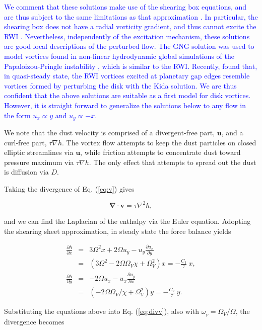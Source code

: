 \documentclass[apj]{emulateapj}
\newcommand{\pderiv}[2]{\frac{\partial #1}{\partial #2}}
\renewcommand{\v}[1]{{\boldsymbol{#1}}} %
\def\blue#1{\textcolor{blue}{ #1}}
\newcommand{\del}{\v{\nabla}}
\newcommand{\Div}{\del\cdot}
\newcommand{\Laplace}{\nabla^2}
\newcommand{\Eq}[1]{Eq. (\ref{#1})}
\newcommand{\eq}[1]{\Eq{#1}}
\newcommand{\beq}{\begin{equation}}
\newcommand{\eeq}{\end{equation}}
\begin{document}
\blue{We comment that these solutions make use of the shearing box
  equations, and are thus subject to the same limitations as that
  approximation \citep{Regev-Umurhan08}. In
  particular, the shearing box does not have a radial vorticity
  gradient, and thus cannot excite the RWI
  \citep{Tagger01}. Nevertheless, independently of the excitation
  mechanism, these solutions are good local descriptions of the perturbed
  flow. The GNG solution was used to model vortices
  found in non-linear hydrodynamic global simulations of the
  Papaloizou-Pringle instability \citep{Hawley87}, which is similar to
  the RWI. Recently, \cite{Lin-Papaloizou11a} found that, in
  quasi-steady state, the RWI vortices excited at planetary gap edges 
  resemble vortices formed by perturbing the disk with
  the Kida solution. We are thus confident that the above solutions are suitable
  as a first model for disk vortices.  However, it is straight forward
  to generalize the solutions below to any flow in the form
  $u_x\propto y$ and $u_y\propto -x$.}

We note that the dust
velocity is comprised of a divergent-free part, $\v{u}$, and a
curl-free part, $\tau\nabla{h}$. The vortex flow attempts to keep the
dust particles on closed elliptic streamlines via $\v{u}$, while friction
attempts to concentrate dust toward pressure maximum via $\tau\nabla
h$. The only effect that attempts to spread out the dust is diffusion
via $D$.  

Taking the divergence of
\eq{eq:v} gives 

\beq
\Div{\v{v}} = \tau \Laplace{h}, 
\label{eq:divv}
\eeq

\noindent and we can find the Laplacian of the enthalpy via the Euler
equation. Adopting the shearing sheet approximation, in steady state
the force balance yields  

\begin{eqnarray}
\pderiv{h}{x} &=& 3\varOmega^2 x + 2\varOmega u_y -
u_y\pderiv{u_x}{y} \nonumber \\
&=& \left(3\varOmega^2 - 2\varOmega\varOmega_V \chi + \varOmega_V^2\right) x
= -\frac{C_1}{\tau} \  x,  \label{eq:gas_mom1}\\
\pderiv{h}{y} &=& - 2\varOmega u_x -
u_x\pderiv{u_y}{x} \nonumber \\
&=& \left(-2\varOmega\varOmega_V/\chi + \varOmega_V^2\right) y = -\frac{C_2}{\tau} \  y.\label{eq:gas_mom2}
\end{eqnarray}

\noindent  Substituting the equations above into \eq{eq:divv}, also
with $\omega_{_V}=\varOmega_V/\varOmega$, the divergence becomes 
\end{document}
